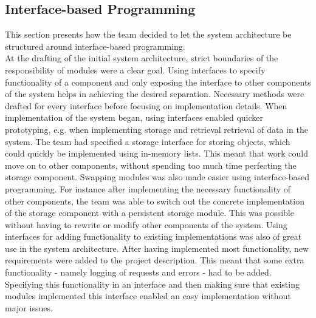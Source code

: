 \subsection{Interface-based Programming}
This section presents how the team decided to let the system architecture be structured around interface-based programming. \\ 

At the drafting of the initial system architecture, strict boundaries of the responsibility of modules were a clear goal. Using interfaces to specify functionality of a component and only exposing the interface to other components of the system helps in achieving the desired separation. \newline
Necessary methods were drafted for every interface before focusing on implementation details. When implementation of the system began, using interfaces enabled quicker prototyping, e.g. when implementing storage and retrieval retrieval of data in the system. \newline 
The team had specified a storage interface for storing objects, which could quickly be implemented using in-memory lists. This meant that work could move on to other components, without spending too much time perfecting the storage component. \newline
Swapping modules was also made easier using interface-based programming. For instance after implementing the necessary functionality of other components, the team was able to switch out the concrete implementation of the storage component with a persistent storage module. This was possible without having to rewrite or modify other components of the system.\newline
Using interfaces for adding functionality to existing implementations was also of great use in the system architecture. After having implemented most functionality, new requirements were added to the project description. This meant that some extra functionality - namely logging of requests and errors - had to be added. \newline
Specifying this functionality in an interface and then making sure that existing modules implemented this interface enabled an easy implementation without major issues. 